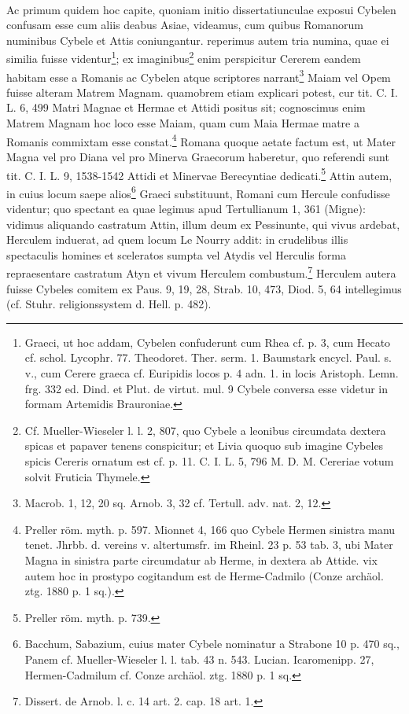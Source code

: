 \documentclass[a4paper, 11pt, oneside, polutonikogreek, german]{article}
\begin{document}
\paragraph{}
Ac primum quidem hoc capite, quoniam initio dissertatiunculae exposui Cybelen confusam esse cum aliis deabus Asiae, videamus, cum quibus Romanorum numinibus Cybele et Attis coniungantur. reperimus autem tria numina, quae ei similia fuisse videntur\footnote{Graeci, ut hoc addam, Cybelen confuderunt cum Rhea cf. p. 3, cum Hecato cf. schol. Lycophr. 77. Theodoret. Ther. serm. 1. Baumstark encycl. Paul. s. v., cum Cerere graeca cf. Euripidis locos p. 4 adn. 1. in locis Aristoph. Lemn. frg. 332 ed. Dind. et Plut. de virtut. mul. 9 Cybele conversa esse videtur in formam Artemidis Brauroniae.}; ex imaginibus\footnote{Cf. Mueller-Wieseler l. l. 2, 807, quo Cybele a leonibus circumdata dextera spicas et papaver tenens conspicitur; et Livia quoquo sub imagine Cybeles spicis Cereris ornatum est cf. p. 11. C. I. L. 5, 796 M. D. M. Cereriae votum solvit Fruticia Thymele.} enim perspicitur Cererem eandem habitam esse a Romanis ac Cybelen atque scriptores narrant\footnote{Macrob. 1, 12, 20 sq. Arnob. 3, 32 cf. Tertull. adv. nat. 2, 12.} Maiam vel Opem fuisse alteram Matrem Magnam. quamobrem etiam explicari potest, cur tit. C. I. L. 6, 499 Matri Magnae et Hermae et Attidi positus sit; cognoscimus enim Matrem Magnam hoc loco esse Maiam, quam cum Maia Hermae matre a Romanis commixtam esse constat.\footnote{Preller röm. myth. p. 597. Mionnet 4, 166 quo Cybele Hermen sinistra manu tenet. Jhrbb. d. vereins v. altertumsfr. im Rheinl. 23 p. 53 tab. 3, ubi Mater Magna in sinistra parte circumdatur ab Herme, in dextera ab Attide. vix autem hoc in prostypo cogitandum est de Herme-Cadmilo (Conze archäol. ztg. 1880 p. 1 sq.).} Romana quoque aetate factum est, ut Mater Magna vel pro Diana vel pro Minerva Graecorum haberetur, quo referendi sunt tit. C. I. L. 9, 1538-1542 Attidi et Minervae Berecyntiae dedicati.\footnote{Preller röm. myth. p. 739.} Attin autem, in cuius locum saepe alios\footnote{Bacchum, Sabazium, cuius mater Cybele nominatur a Strabone 10 p. 470 sq., Panem cf. Mueller-Wieseler l. l. tab. 43 n. 543. Lucian. Icaromenipp. 27, Hermen-Cadmilum cf. Conze archäol. ztg. 1880 p. 1 sq.} Graeci substituunt, Romani cum Hercule confudisse videntur; quo spectant ea quae legimus apud Tertullianum 1, 361 (Migne): vidimus aliquando castratum Attin, illum deum ex Pessinunte, qui vivus ardebat, Herculem induerat, ad quem locum Le Nourry addit: in crudelibus illis spectaculis homines et sceleratos sumpta vel Atydis vel Herculis forma repraesentare castratum Atyn et vivum Herculem combustum.\footnote{Dissert. de Arnob. l. c. 14 art. 2. cap. 18 art. 1.} Herculem autera fuisse Cybeles comitem ex Paus. 9, 19, 28, Strab. 10, 473, Diod. 5, 64 intellegimus (cf. Stuhr. religionssystem d. Hell. p. 482).
\end{document}

